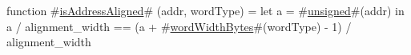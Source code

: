 function #\hyperref[sailMIPSzisAddressAligned]{isAddressAligned}# (addr, wordType) =
  let a = #\hyperref[sailMIPSzunsigned]{unsigned}#(addr) in
  a / alignment_width == (a + #\hyperref[sailMIPSzwordWidthBytes]{wordWidthBytes}#(wordType) - 1) / alignment_width

